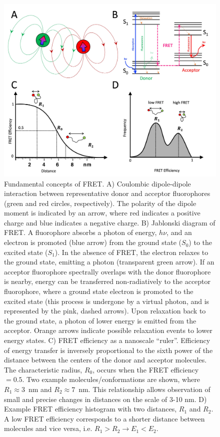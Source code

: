 \begin{figure}
    \centering
    \includegraphics[width=\textwidth]{chapters/figures/FRET_concept.jpg}
    \caption{\label{fig:FRET_concept} 
    Fundamental concepts of FRET.
    A) Coulombic dipole-dipole interaction between representative donor and acceptor fluorophores (green and red circles, respectively).
    The polarity of the dipole moment is indicated by an arrow, where red indicates a positive charge and blue indicates a negative charge. 
    B) Jablonski diagram of FRET. A fluorophore absorbs a photon of energy, $h\nu$, and an electron is promoted (blue arrow) from the ground state ($S_0$) to the excited state ($S_1$).
    In the absence of FRET, the electron relaxes to the ground state, emitting a photon (transparent green arrow). 
    If an acceptor fluorophore spectrally overlaps with the donor fluorophore is nearby, energy can be transferred non-radiatively to the acceptor fluorophore, where a ground state electron is promoted to the excited state (this process is undergone by a virtual photon, and is represented by the pink, dashed arrows). 
    Upon relaxation back to the ground state, a photon of lower energy is emitted from the acceptor. 
    Orange arrows indicate possible relaxation events to lower energy states. 
    C) FRET efficiency as a nanoscale \enquote{ruler}. 
    Efficiency of energy transfer is inversely proportional to the sixth power of the distance between the centers of the donor and acceptor molecules.
    The characteristic radius, $R_0$, occurs when the FRET efficiency $=0.5$.
    Two example molecules/conformations are shown, where $R_1 \approx 3$~nm and $R_2 \approx 7$~nm. 
    This relationship allows observation of small and precise changes in distances on the scale of 3-10 nm.
    D) Example FRET efficiency histogram with two distances, $R_1$ and $R_2$.
    A low FRET efficiency corresponds to a shorter distance between molecules and vice versa, i.e. $R_1 > R_2 \rightarrow E_1 < E_2$.}
\end{figure}

